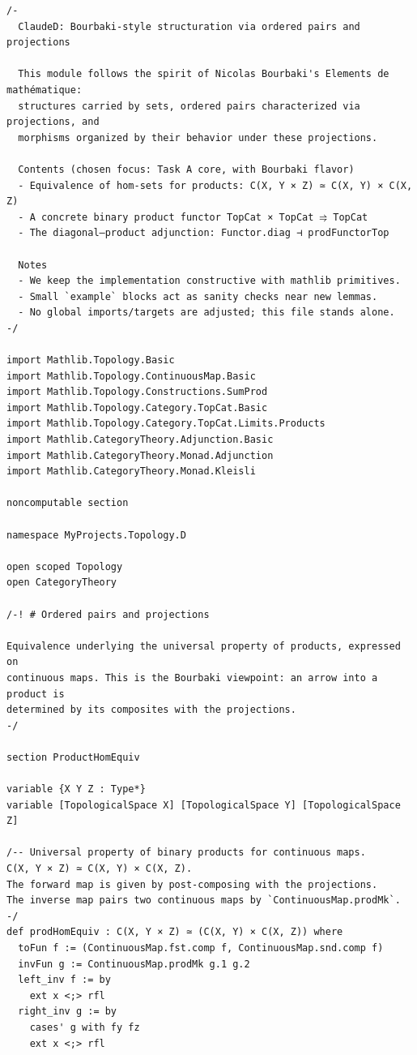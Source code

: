 \documentclass[12pt]{article}
\theoremstyle{definition}
\begin{document}
\begin{lstlisting}
/-
  ClaudeD: Bourbaki-style structuration via ordered pairs and projections

  This module follows the spirit of Nicolas Bourbaki's Elements de mathématique:
  structures carried by sets, ordered pairs characterized via projections, and
  morphisms organized by their behavior under these projections.

  Contents (chosen focus: Task A core, with Bourbaki flavor)
  - Equivalence of hom-sets for products: C(X, Y × Z) ≃ C(X, Y) × C(X, Z)
  - A concrete binary product functor TopCat × TopCat ⥤ TopCat
  - The diagonal–product adjunction: Functor.diag ⊣ prodFunctorTop

  Notes
  - We keep the implementation constructive with mathlib primitives.
  - Small `example` blocks act as sanity checks near new lemmas.
  - No global imports/targets are adjusted; this file stands alone.
-/

import Mathlib.Topology.Basic
import Mathlib.Topology.ContinuousMap.Basic
import Mathlib.Topology.Constructions.SumProd
import Mathlib.Topology.Category.TopCat.Basic
import Mathlib.Topology.Category.TopCat.Limits.Products
import Mathlib.CategoryTheory.Adjunction.Basic
import Mathlib.CategoryTheory.Monad.Adjunction
import Mathlib.CategoryTheory.Monad.Kleisli

noncomputable section

namespace MyProjects.Topology.D

open scoped Topology
open CategoryTheory

/-! # Ordered pairs and projections

Equivalence underlying the universal property of products, expressed on
continuous maps. This is the Bourbaki viewpoint: an arrow into a product is
determined by its composites with the projections.
-/

section ProductHomEquiv

variable {X Y Z : Type*}
variable [TopologicalSpace X] [TopologicalSpace Y] [TopologicalSpace Z]

/-- Universal property of binary products for continuous maps.
C(X, Y × Z) ≃ C(X, Y) × C(X, Z).
The forward map is given by post-composing with the projections.
The inverse map pairs two continuous maps by `ContinuousMap.prodMk`.
-/
def prodHomEquiv : C(X, Y × Z) ≃ (C(X, Y) × C(X, Z)) where
  toFun f := (ContinuousMap.fst.comp f, ContinuousMap.snd.comp f)
  invFun g := ContinuousMap.prodMk g.1 g.2
  left_inv f := by
    ext x <;> rfl
  right_inv g := by
    cases' g with fy fz
    ext x <;> rfl


\end{lstlisting}
\end{document}

